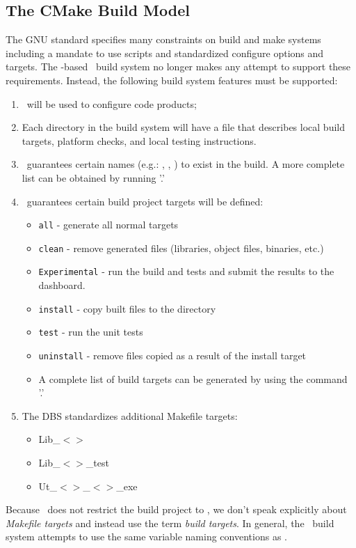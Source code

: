 \subsection{The CMake Build Model}
\label{sec:cmake_build_model}

The GNU standard specifies many constraints on build and make systems including a mandate to use   scripts and standardized configure options and  targets.  The \cmake-based \draco\ build system no longer makes any attempt to support these requirements.  Instead, the following build system features must be supported:
\begin{enumerate}
\item \cmake\ will be used to configure code products;
\item Each directory in the build system will have a  file that describes local build targets, platform checks, and local testing instructions.
\item \cmake\ guarantees certain names (e.g.: , , ) to exist in the build.  A more complete list can be obtained by running '.'
\item \cmake\ guarantees certain build project targets will be defined:
\begin{itemize}
\item \texttt{all} - generate all normal targets
\item \texttt{clean} - remove generated files (libraries, object files, binaries, etc.)
\item \texttt{Experimental} - run the build and tests and submit the results to the dashboard.
\item \texttt{install} - copy built files to the  directory 
\item \texttt{test} -  run the unit tests
\item \texttt{uninstall} - remove files copied as a result of the install
  target
\item A complete list of build targets can be generated by using the
  command '.'
\end{itemize}
\item The DBS standardizes additional Makefile targets:
\begin{itemize}
\item Lib\_$<$$>$
\item  Lib\_$<$$>$\_test
\item Ut\_$<$$>$\_$<$$>$\_exe
\end{itemize}
\end{enumerate}
Because \cmake\ does not restrict the build project to , we don't speak explicitly about {\it Makefile targets} and instead use the term {\it build targets}.  In general, the \draco\ build system attempts to use the same variable naming conventions as \cmake.

